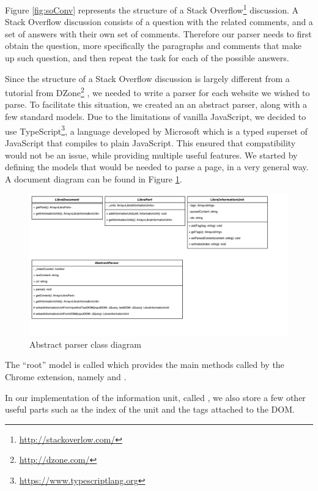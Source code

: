 Figure \ref{fig:soConv} represents the structure of a Stack Overflow\footnote{\url{http://stackoverlow.com/}} discussion. A Stack Overflow discussion consists of a question with the related comments, and a set of answers with their own set of comments. Therefore our parser needs to first obtain the question, more specifically the paragraphs and comments that make up such question, and then repeat the task for each of the possible answers. 

Since the structure of a Stack Overflow discussion is largely different from a tutorial from DZone\footnote{\url{http://dzone.com/}} , we needed to write a parser for each website we wished to parse. To facilitate this situation, we created an an abstract parser, along with a few standard models. Due to the limitations of vanilla JavaScript, we decided to use TypeScript\footnote{\url{https://www.typescriptlang.org}}, a language developed by Microsoft which is a typed superset of JavaScript that compiles to plain JavaScript. This ensured that compatibility would not be an issue, while providing multiple useful features. We started by defining the models that would be needed to parse a page, in a very general way. A document diagram can be found in Figure \ref{fig:abstractParserClassDiagram}.

\begin{figure}[H]
\centering
\includegraphics[scale=0.5]{Figures/ClassUML}
\caption{Abstract parser class diagram}
\label{fig:abstractParserClassDiagram}
\end{figure}

The ``root'' model is called  which provides the main methods called by the Chrome extension, namely  and . 

In our implementation of the information unit, called , we also store a few other useful parts such as the index of the unit and the tags attached to the DOM. 

